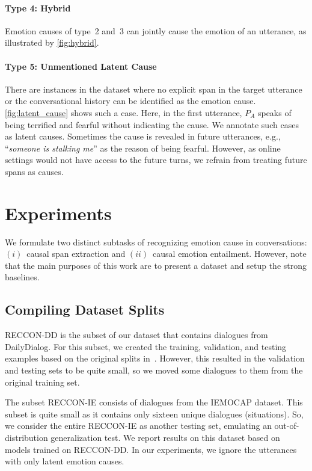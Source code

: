 \documentclass[smallextended]{svjour3}
\newcommand\RECCON{recognizing emotion cause in conversations} \newcommand\ECRIC{ECRIC}
\newcommand\RECCONDADD{RECCON-DD}
\newcommand\RECCONDAIE{RECCON-IE}
\newcommand\DailyDialog{Daily\-Dialog}
\newcommand\0{\hphantom{0}}
\begin{document}
\paragraph{Type 4: Hybrid} Emotion causes of type~2 and~3 can jointly cause the emotion of an utterance, as illustrated by \cref{fig:hybrid}.




\paragraph{Type 5: Unmentioned Latent Cause} There are instances in the dataset where no explicit span in the target utterance or the conversational history can be identified as the emotion cause. \cref{fig:latent_cause} shows such a case. Here, in the first utterance, $P_A$ speaks of being terrified and fearful without indicating the cause. We annotate such cases as latent causes. Sometimes the cause is revealed in future utterances, e.g., ``\textit{someone is stalking me}'' as the reason of being fearful. However, as online settings would not have access to the future turns, we refrain from treating future spans as 
causes.


\section{Experiments}
\label{sec:experiments}

We formulate two distinct subtasks of \RECCON{}: \textit{$(i)$}~causal span extraction and \textit{$(ii)$}~causal emotion entailment. However, 
note that
the main purposes of this work are to present a dataset and setup the strong baselines. 


\subsection{Compiling Dataset Splits}
\label{sec:dataprep}

\RECCONDADD{} is the subset of our dataset that contains dialogues from \DailyDialog{}. For this subset, we created the training, validation, and testing examples based on the original splits in~\cite{li2017DailyDialog}. However, this resulted in the validation and testing sets to be quite small, so we moved some dialogues to them from the original training set. 

The subset \RECCONDAIE{} consists of dialogues from the IEMOCAP dataset. This subset is quite small as it contains only sixteen unique dialogues (situations). So, we consider the entire \RECCONDAIE{}  as another testing set, emulating an out-of-distribution generalization test. We report results on this dataset based on models trained on \RECCONDADD{}. In our experiments, we ignore the utterances with only latent emotion causes. 
\end{document}
